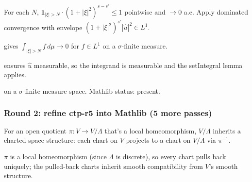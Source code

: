 \begin{lemma}
\label{lem:rk-r7}
For each $N$, $\mathbf{1}_{|\xi|>N}\cdot(1+|\xi|^{2})^{s-s'}\le 1$ pointwise and $\to 0$ a.e.  Apply dominated convergence with envelope $(1+|\xi|^{2})^{s'}|\hat u|^{2}\in L^{1}$.
\leanok
\end{lemma}

\begin{lemma}
\label{lem:rk-r8}
 gives $\int_{|\xi|>N}f\,d\mu\to 0$ for $f\in L^{1}$ on a $\sigma$-finite measure.
\leanok\mathlibok
\end{lemma}

\begin{lemma}
\label{lem:rk-r9}
 ensures $\hat u$ measurable, so the integrand is measurable and the setIntegral lemma applies.
\leanok
\end{lemma}

\begin{lemma}
\label{lem:rk-r10}
 on a $\sigma$-finite measure space.  Mathlib status: present.
\leanok\mathlibok
\end{lemma}

\subsubsection*{Round 2: refine ctp-r5 into Mathlib (5 more passes)}

\begin{lemma}
\label{lem:ctp-r6}
For an open quotient $\pi : V \to V/\Lambda$ that's a local homeomorphism, $V/\Lambda$ inherits a charted-space structure: each chart on $V$ projects to a chart on $V/\Lambda$ via $\pi^{-1}$.
\leanok
\end{lemma}

\begin{lemma}
\label{lem:ctp-r7}
$\pi$ is a local homeomorphism (since $\Lambda$ is discrete), so every chart pulls back uniquely; the pulled-back charts inherit smooth compatibility from $V$'s smooth structure.
\leanok
\end{lemma}

